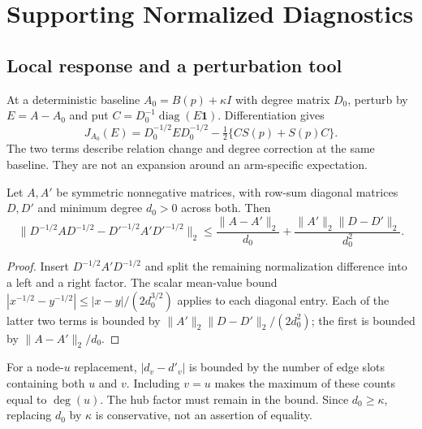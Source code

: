 \section{Supporting Normalized Diagnostics}\label{app:normalized-diagnostics}

\subsection{Local response and a perturbation tool}
At a deterministic baseline $A_0=B(p)+\kappa I$ with degree matrix
$D_0$, perturb by $E=A-A_0$ and put
$C=D_0^{-1}\operatorname{diag}(E\mathbf1)$. Differentiation gives
\[
J_{A_0}(E)=D_0^{-1/2}ED_0^{-1/2}
-\tfrac12\{CS(p)+S(p)C\}.
\]
The two terms describe relation change and degree correction at the
same baseline. They are not an expansion around an arm-specific
expectation.

\begin{lemma}\label{lem:norm-perturbation}
Let $A,A'$ be symmetric nonnegative matrices, with row-sum diagonal
matrices $D,D'$ and minimum degree $d_0>0$ across both. Then
\[
\|D^{-1/2}AD^{-1/2}-D'^{-1/2}A'D'^{-1/2}\|_2
\le \frac{\|A-A'\|_2}{d_0}
+\frac{\|A'\|_2\|D-D'\|_2}{d_0^2}.
\]
\end{lemma}
\begin{proof}
Insert $D^{-1/2}A'D^{-1/2}$ and split the remaining normalization
difference into a left and a right factor. The scalar mean-value
bound $|x^{-1/2}-y^{-1/2}|\le|x-y|/(2d_0^{3/2})$ applies to
each diagonal entry. Each of the latter two terms is bounded by
$\|A'\|_2\|D-D'\|_2/(2d_0^2)$; the first is bounded by
$\|A-A'\|_2/d_0$.
\end{proof}
For a node-$u$ replacement, $|d_v-d'_v|$ is bounded by the number
of edge slots containing both $u$ and $v$. Including $v=u$ makes
the maximum of these counts equal to $\deg(u)$. The hub factor
must remain in the bound. Since $d_0\ge\kappa$, replacing $d_0$
by $\kappa$ is conservative, not an assertion of equality.

